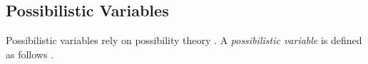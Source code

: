 







\subsection{\label{subsec:possibilistic-variables}Possibilistic Variables}
Possibilistic variables rely on possibility theory \cite{Dubois:Prade:1988:PossibilityTheory}. A \emph{possibilistic variable} is defined as follows \cite{Pon11}.


